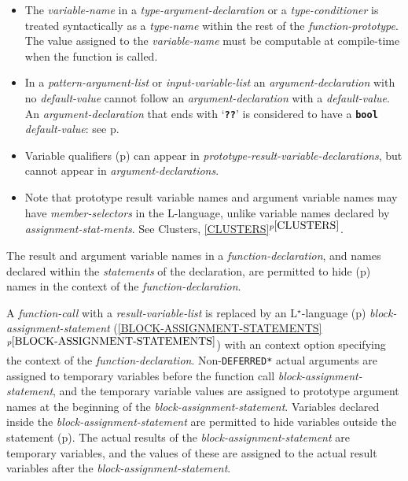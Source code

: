 \documentclass[12pt]{article}
\newcommand{\LSTAR}{L$^\star$}
\newcommand{\TT}[1]{{\tt \bfseries #1}}
\newcommand{\itemref}[1]{\ref{#1}$^{p\pageref{#1}}$}
\newcommand{\pagref}[1]{p\pageref{#1}}
\newenvironment{indpar}[1][0.3in]%
	{\begin{list}{}%
		     {\setlength{\itemsep}{0in}%
		      \setlength{\topsep}{0in}%
		      \setlength{\parsep}{1ex}%
		      \setlength{\labelwidth}{#1}%
		      \setlength{\leftmargin}{#1}%
		      \addtolength{\leftmargin}{\labelsep}}%
	 \item}%
	{\end{list}}
\begin{document}
\begin{indpar}
\begin{itemize}
{\em variable-name} must be computable at compile-time when the
function is called.
\item
The {\em variable-name} in a {\em type-argument-declaration}
or a {\em type-conditioner} is treated syntactically as a {\em type-name}
within the rest of the {\em function-prototype}.  The value assigned to the
{\em variable-name} must be computable at compile-time when the
function is called.
\item
In a {\em pattern-argument-list} or {\em input-variable-list}
an {\em argument-declaration} with no {\em de\-fault-value} cannot
follow an {\em argument-declaration} with a {\em default-value}.
An {\em argument-declaration} that ends with `\TT{??}' is considered
to have a \TT{bool} {\em default-value}: see \pagref{BOOL-DEFAULT}.
\item
Variable qualifiers (\pagref{VARIABLE-QUALIFIER}) can appear
in {\em prototype-result-variable-declarations}, but
cannot appear in {\em argument-declarations}.
\item
Note that prototype result variable names and argument variable names
may have {\em mem\-ber-selectors} in the L-language, unlike
variable names declared by {\em assignment-stat-ments}.  See
Clusters, \itemref{CLUSTERS}.



\end{itemize}
\end{indpar}

The result and argument variable names in a
{\em function-declaration},
and names declared within the {\em statements} of the declaration,
are permitted to hide (\pagref{HIDE})
names in the context of the {\em function-declara\-tion}.

A {\em function-call} with a {\em result-variable-list}
is replaced by an \LSTAR-language (\pagref{LSTAR-LANGUAGE})
{\em block-assignment-statement} (\itemref{BLOCK-ASSIGNMENT-STATEMENTS})
with an context option specifying the context of the
{\em function-declaration}.
Non-{\tt *DEFERRED*} actual arguments are assigned to temporary variables
before the function call {\em block-assignment-statement},
and the temporary variable values are assigned to prototype argument names
at the beginning of the {\em block-assignment-statement}.
Variables declared inside the
{\em block-assign\-ment-statement} are permitted to hide variables outside
the statement (\pagref{HIDE}).  The actual results of the
{\em block-assignment-statement} are temporary variables,
and the values of these are assigned
to the actual result variables after the {\em block-assignment-statement}.
\end{document}
